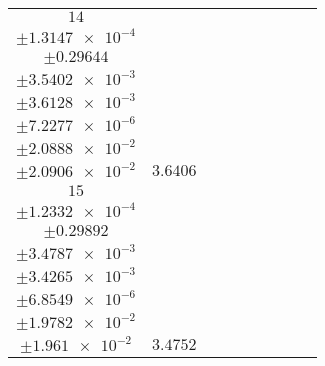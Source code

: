 \documentclass[8pt]{article}
\begin{document}
\begin{longtable}[l]{c c c c c c c c c}
$\num{14}$ & \begin{tabular}[c]{@{}c@{}}$\num{2.7315e-2}$ \\ $\pm\num{1.3147e-4}$\end{tabular} & \begin{tabular}[c]{@{}c@{}}$\num{-1.7815}$ \\ $\pm\num{0.29644}$\end{tabular} & \begin{tabular}[c]{@{}c@{}}$\num{-2.6085}$ \\ $\pm\num{3.5402e-3}$\end{tabular} & \begin{tabular}[c]{@{}c@{}}$\num{1.6067e+3}$ \\ $\pm\num{3.6128e-3}$\end{tabular} & \begin{tabular}[c]{@{}c@{}}$\num{3.2142}$ \\ $\pm\num{7.2277e-6}$\end{tabular} & \begin{tabular}[c]{@{}c@{}}$\num{3.756}$ \\ $\pm\num{2.0888e-2}$\end{tabular} & \begin{tabular}[c]{@{}c@{}}$\num{3.79}$ \\ $\pm\num{2.0906e-2}$\end{tabular} & $\num{3.6406}$\\
$\num{15}$ & \begin{tabular}[c]{@{}c@{}}$\num{2.5917e-2}$ \\ $\pm\num{1.2332e-4}$\end{tabular} & \begin{tabular}[c]{@{}c@{}}$\num{0.63179}$ \\ $\pm\num{0.29892}$\end{tabular} & \begin{tabular}[c]{@{}c@{}}$\num{2.6184}$ \\ $\pm\num{3.4787e-3}$\end{tabular} & \begin{tabular}[c]{@{}c@{}}$\num{1.6119e+3}$ \\ $\pm\num{3.4265e-3}$\end{tabular} & \begin{tabular}[c]{@{}c@{}}$\num{3.2247}$ \\ $\pm\num{6.8549e-6}$\end{tabular} & \begin{tabular}[c]{@{}c@{}}$\num{3.6113}$ \\ $\pm\num{1.9782e-2}$\end{tabular} & \begin{tabular}[c]{@{}c@{}}$\num{3.5649}$ \\ $\pm\num{1.961e-2}$\end{tabular} & $\num{3.4752}$\\

\end{longtable}
\end{document}
